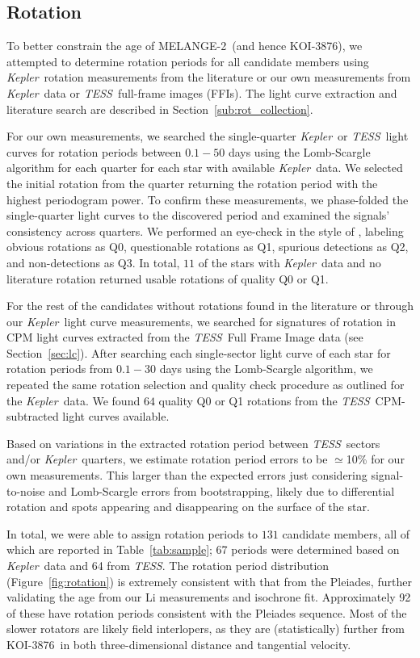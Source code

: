 \documentclass[twocolumn]{aastex631}
\newcommand{\starname}{KOI-3876}
\newcommand{\kepler}{{\it Kepler}}
\newcommand{\tess}{\textit{TESS}}
\newcommand{\association}{MELANGE-2}
\begin{document}
\subsection{Rotation}\label{sec:rotation}
To better constrain the age of \association\ (and hence \starname), we attempted to determine rotation periods for all candidate members using \kepler\ rotation measurements from the literature or our own measurements from \kepler\ data or \tess\ full-frame images (FFIs). The light curve extraction and literature search are described in Section~\ref{sub:rot_collection}. 

For our own measurements, we searched the single-quarter \kepler\ or \tess\ light curves for rotation periods between $0.1-50$ days using the Lomb-Scargle algorithm \citep{LombScargle} for each quarter for each star with available \kepler\ data. We selected the initial rotation from the quarter returning the rotation period with the highest periodogram power. To confirm these measurements, we phase-folded the single-quarter light curves to the discovered period and examined the signals' consistency across quarters. We performed an eye-check in the style of \citet{2021arXiv210613250R}, labeling obvious rotations as Q0, questionable rotations as Q1, spurious detections as Q2, and non-detections as Q3. In total, $11$ of the stars with \kepler\ data and no literature rotation returned usable rotations of quality Q0 or Q1.

For the rest of the candidates without rotations found in the literature or through our \kepler\ light curve measurements, we searched for signatures of rotation in CPM light curves extracted from the \tess\ Full Frame Image data (see Section~\ref{sec:lc}). After searching each single-sector light curve of each star for rotation periods from $0.1-30$ days using the Lomb-Scargle algorithm, we repeated the same rotation selection and quality check procedure as outlined for the \kepler\ data. We found $64$ quality Q0 or Q1 rotations from the \tess\ CPM-subtracted light curves available. 

Based on variations in the extracted rotation period between \tess\ sectors and/or \kepler\ quarters, we estimate rotation period errors to be $\simeq$10\% for our own measurements. This larger than the expected errors just considering signal-to-noise and Lomb-Scargle errors from bootstrapping, likely due to differential rotation and spots appearing and disappearing on the surface of the star.

In total, we were able to assign rotation periods to $131$ candidate members, all of which are reported in Table~\ref{tab:sample}; 67 periods were determined based on \kepler\ data and 64 from \tess. The rotation period distribution (Figure~\ref{fig:rotation}) is extremely consistent with that from the Pleiades, further validating the age from our Li measurements and isochrone fit. Approximately 92 of these have rotation periods consistent with the Pleiades sequence. Most of the slower rotators are likely field interlopers, as they are (statistically) further from \starname\ in both three-dimensional distance and tangential velocity. 
\end{document}
